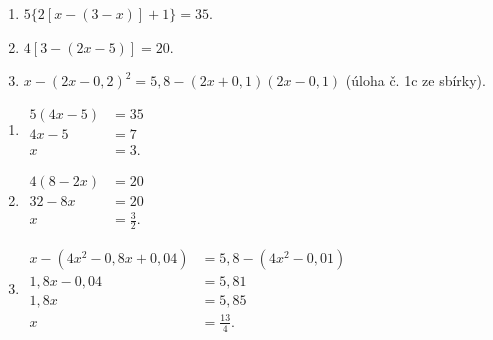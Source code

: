 \documentclass[11pt,a4paper]{article}
\begin{document}
\begin{zadaniReseniBox}
\begin{enumerate}[label=\alph*)]
\item $5\{2[x-(3-x)]+1\}=35$.
\item $4[3-(2x-5)]=20$.
\item $x-(2x-0{,}2)^2=5{,}8-(2x+0{,}1)(2x-0{,}1)$ (úloha č. 1c ze sbírky).
\end{enumerate}
\tcblower
\begin{enumerate}[label=\alph*)]
\item \(\begin{aligned}5(4x-5)&=35\\4x-5&=7\\x&=3.\end{aligned}\)
\item \(\begin{aligned}4(8-2x)&=20\\32-8x&=20\\x&=\tfrac32.\end{aligned}\)
\item \(\begin{aligned}x-(4x^2-0{,}8x+0{,}04)&=5{,}8-(4x^2-0{,}01)\\1{,}8x-0{,}04&=5{,}81\\1{,}8x&=5{,}85\\x&=\tfrac{13}{4}.\end{aligned}\)
\end{enumerate}
\end{zadaniReseniBox}
\end{document}
